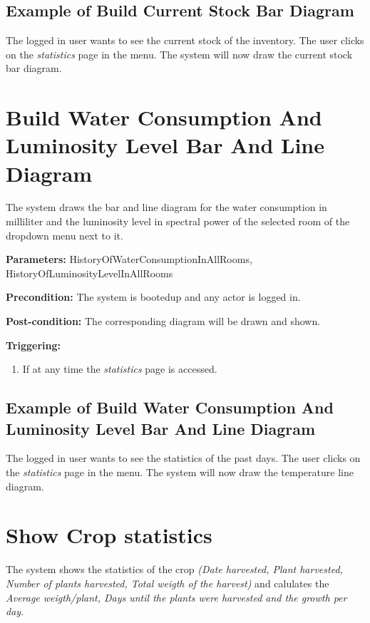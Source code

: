 \subsection{Example of Build Current Stock Bar Diagram}
The logged in user wants to see the current stock of the inventory.
The user clicks on the \emph{statistics} page in the menu.
The system will now draw the current stock bar diagram.



\break
\section{Build Water Consumption And Luminosity Level Bar And Line Diagram}
\label{operation:BuildWaterConsumptionAndLuminosityLevelDiagram}
The system draws the bar and line diagram for the water consumption in
milliliter and the luminosity level in spectral power of the selected room of
the dropdown menu next to it.

\begin{description}

\item \textbf{Parameters:} HistoryOfWaterConsumptionInAllRooms,
HistoryOfLuminosityLevelInAllRooms
\item \textbf{Precondition:} The system is bootedup and any actor is logged in.
\item \textbf{Post-condition:} The corresponding diagram will be drawn and
shown.

\item \textbf{Triggering:}
\begin{enumerate}
\item If at any time the \emph{statistics} page is accessed.
\end{enumerate}
\end{description}

\subsection{Example of Build Water Consumption And Luminosity Level Bar And Line
Diagram}
The logged in user wants to see the statistics of the past days.
The user clicks on the \emph{statistics} page in the menu.
The system will now draw the temperature line diagram.




\section{Show Crop statistics}
\label{operation:ShowCropStatistics}
The system shows the statistics of the crop \emph{(Date harvested, Plant
harvested, Number of plants harvested, Total weigth of the harvest)} and
calulates the \emph{Average weigth/plant, Days until the plants were harvested
and the growth per day}.

